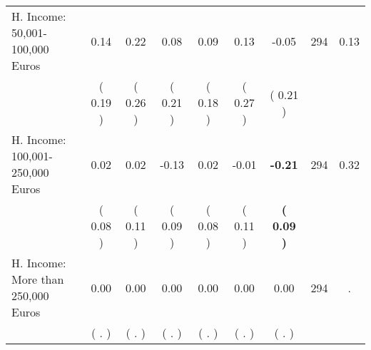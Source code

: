 \begin{tabular}{lcccccccc}
H. Income: 50,001-100,000 Euros &      0.14 &      0.22 &      0.08 &      0.09 &      0.13 &     -0.05 & 294 &       0.13 \\ 
 & (     0.19 ) & (     0.26 ) & (     0.21 ) & (     0.18 ) & (     0.27 ) & (     0.21 ) & \\
H. Income: 100,001-250,000 Euros &      0.02 &      0.02 &     -0.13 &      0.02 &     -0.01 & \textbf{    -0.21} & 294 &       0.32 \\ 
 & (     0.08 ) & (     0.11 ) & (     0.09 ) & (     0.08 ) & (     0.11 ) & \textbf{(     0.09 )} & \\
H. Income: More than 250,000 Euros &      0.00 &      0.00 &      0.00 &      0.00 &      0.00 &      0.00 & 294 &          . \\ 
 & (        . ) & (        . ) & (        . ) & (        . ) & (        . ) & (        . ) & \\
\bottomrule
\end{tabular}
